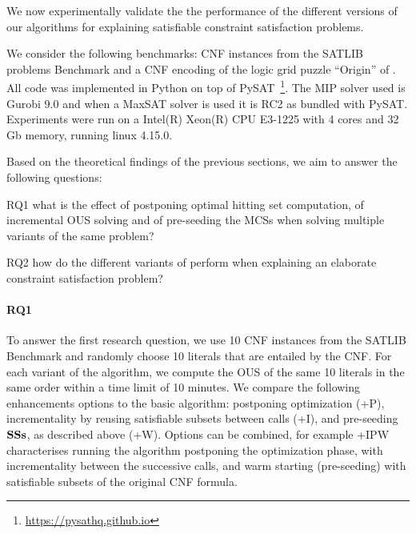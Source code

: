 We now experimentally validate the the performance of the different versions of our algorithms for explaining satisfiable constraint satisfaction problems.

We consider the following benchmarks: CNF instances from the SATLIB problems Benchmark \cite{hoos2000satlib} and a CNF encoding of the logic grid puzzle ``Origin'' of \citet{ecai/BogaertsGCG20}. All code was implemented in Python on top of %
PySAT~\footnote{\url{https://pysathq.github.io}}. The MIP solver used is Gurobi 9.0 and when a MaxSAT solver is used it is RC2 as bundled with PySAT. Experiments were run on a Intel(R) Xeon(R) CPU E3-1225 with 4 cores and 32 Gb memory, running linux 4.15.0.

Based on the theoretical findings of the previous sections, we aim to answer the following questions:
\begin{compactdesc}
\item[RQ1] what is the effect of postponing optimal hitting set computation, of incremental OUS solving and of pre-seeding the MCSs when solving multiple variants of the same problem?
\item[RQ2] how do the different variants of \omus perform when explaining an elaborate constraint satisfaction problem?
\end{compactdesc}


\paragraph{RQ1}
To answer the first research question, we use 10 CNF instances from the SATLIB Benchmark and randomly choose 10 literals that are entailed by the CNF. For each variant of the algorithm, we compute the OUS of the same 10 literals in the same order within a time limit of 10 minutes. 
We compare the following enhancements options to the basic \omus algorithm: postponing optimization (+P), incrementality by reusing satisfiable subsets between \omus calls (+I), and pre-seeding $\mathbf{SSs}$, as described above (+W). Options can be combined, for example \omus+IPW characterises running the \omus algorithm postponing the optimization phase, with incrementality between the successive calls, and warm starting (pre-seeding) with satisfiable subsets of the original CNF formula.

